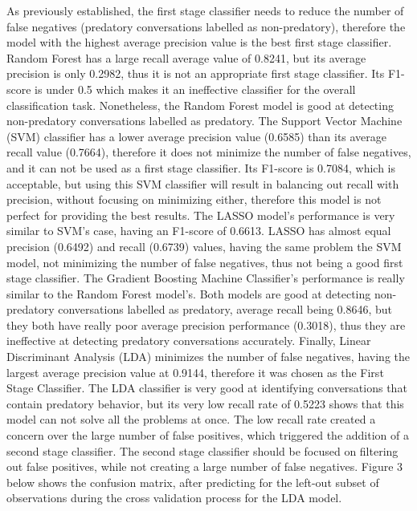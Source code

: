\documentclass[11pt]{article}
\begin{document}
As previously established, the first stage classifier needs to reduce the number of false negatives (predatory conversations labelled as non-predatory), therefore the model with the highest average precision value is the best first stage classifier. Random Forest has a large recall average value of 0.8241, but its average precision is only 0.2982, thus it is not an appropriate first stage classifier. Its F1-score is under 0.5 which makes it an ineffective classifier for the overall classification task. Nonetheless, the Random Forest model is good at detecting non-predatory conversations labelled as predatory. The Support Vector Machine (SVM) classifier has a lower average precision value (0.6585) than its average recall value (0.7664), therefore it does not minimize the number of false negatives, and it can not be used as a first stage classifier. Its F1-score is 0.7084, which is acceptable, but using this SVM classifier will result in balancing out recall with precision, without focusing on minimizing either, therefore this model is not perfect for providing the best results. The LASSO model's performance is very similar to SVM's case, having an F1-score of 0.6613. LASSO has almost equal precision (0.6492) and recall (0.6739) values, having the same problem the SVM model,  not minimizing the number of false negatives, thus not being a good first stage classifier. The Gradient Boosting Machine Classifier's performance is really similar to the Random Forest model's. Both models are good at detecting non-predatory conversations labelled as predatory, average recall being 0.8646, but they both have really poor average precision performance (0.3018), thus they are ineffective at detecting predatory conversations accurately. Finally, Linear Discriminant Analysis (LDA) minimizes the number of false negatives, having the largest average precision value at 0.9144, therefore it was chosen as the First Stage Classifier. The LDA classifier is very good at identifying conversations that contain predatory behavior, but its very low recall rate of 0.5223 shows that this model can not solve all the problems at once. The low recall rate created a concern over the large number of false positives, which triggered the addition of a second stage classifier. The second stage classifier should be focused on filtering out false positives, while not creating a large number of false negatives. Figure 3 below shows the confusion matrix, after predicting for the left-out subset of observations during the cross validation process for the LDA model.
\end{document}
